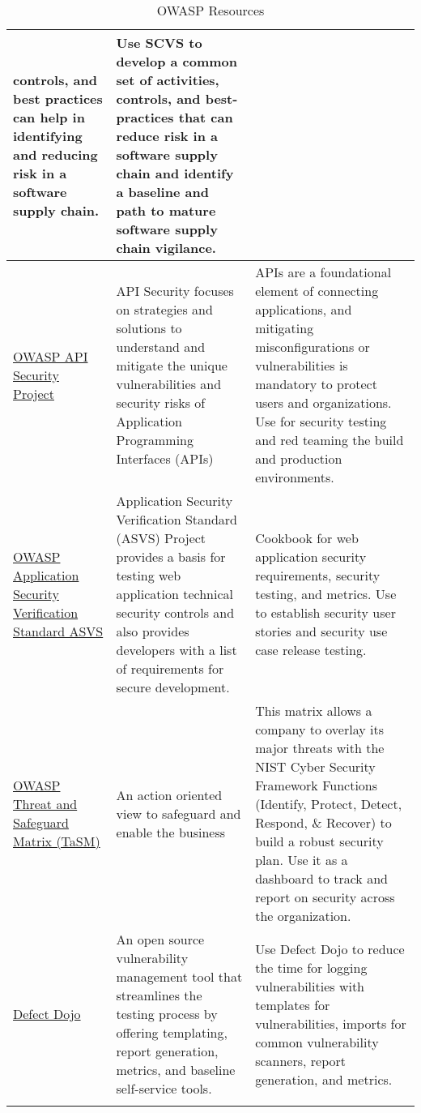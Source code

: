 \begin{longtable}[c]{|p{}|p{}|p{}|}
  controls, and best practices can help in identifying and reducing risk in a
  software supply chain. &
  Use SCVS to develop a common set of activities, controls, and best-practices
  that can reduce risk in a software supply chain and identify a baseline and
  path to mature software supply chain vigilance. \\
  \hline
  \href{https://owasp.org/www-project-api-security/}{OWASP API Security Project } &
  API Security focuses on strategies and solutions to understand and mitigate
  the unique vulnerabilities and security risks of Application Programming
  Interfaces (APIs) &
  APIs are a foundational element of connecting applications, and mitigating
  misconfigurations or vulnerabilities is mandatory to protect users and
  organizations. Use for security testing and red teaming the build and
  production environments. \\
  \hline
  \href{https://owasp.org/www-project-application-security-verification-standard/}{OWASP Application Security Verification Standard ASVS} &
  Application Security Verification Standard (ASVS) Project provides a basis
  for testing web application technical security controls and also provides
  developers with a list of requirements for secure development. &
  Cookbook for web application security requirements, security testing, and
  metrics. Use to establish security user stories and security use case release
  testing. \\
  \hline
  \href{https://owasp.org/www-project-threat-and-safeguard-matrix/}{OWASP Threat and Safeguard Matrix (TaSM)} &
  An action oriented view to safeguard and enable the business &
  This matrix allows a company to overlay its major threats with the NIST Cyber
  Security Framework Functions (Identify, Protect, Detect, Respond, \& Recover)
  to build a robust security plan. Use it as a dashboard to track and report on
  security across the organization. \\
  \hline
  \href{https://www.defectdojo.com/}{Defect Dojo} &
  An open source vulnerability management tool that streamlines the testing
  process by offering templating, report generation, metrics, and baseline
  self-service tools. &
  Use Defect Dojo to reduce the time for logging vulnerabilities with templates
  for vulnerabilities, imports for common vulnerability scanners, report
  generation, and metrics. \\
  \hline
  \caption{OWASP Resources}
  \label{tab:owasp-resources}
\end{longtable}
